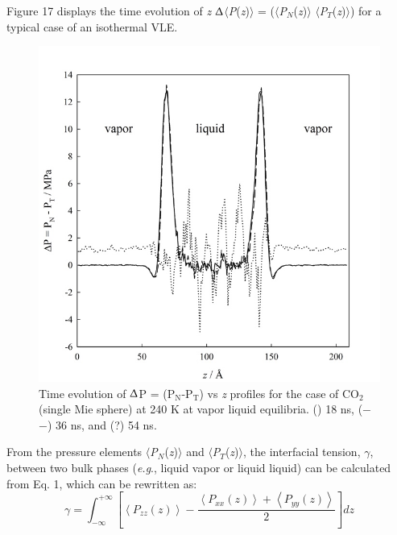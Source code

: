 \documentclass{scrbook}
\begin{document}
Figure 17 displays the time evolution of \textit{z} \textendash{}
${\Updelta}$${\langle}$\textit{P}(\textit{z})${\rangle}$
= (${\langle}$\textit{P}$_{N}$(\textit{z})${\rangle}$ \textendash{}
${\langle}$\textit{P}$_{T}$(\textit{z})${\rangle}$) for a typical case of an
isothermal VLE. 
\begin{figure}
\includegraphics[width=1\textwidth]{gfx/image61.jpeg}
\caption{Time evolution of {${\Updelta}$}P = (P$_{\mathrm{N}}$-P$_{\mathrm{T}}$) vs \textit{z} profiles for the case of CO$_{2}$ (single Mie sphere) at 240 K at vapor \textendash{} liquid equilibria. ({\textbullet}{\textbullet}{\textbullet}) 18 ns, (${-}$ ${-}$) 36 ns, and (?) 54 ns.}
\label{fig:17}
\end{figure}
From the pressure elements ${\langle}$\textit{P}$_{N}$(\textit{z})${\rangle}$
and ${\langle}$\textit{P}$_{T}$(\textit{z})${\rangle}$, the interfacial
tension, ${\gamma}$, between two bulk phases (\textit{e.g}., liquid
\textendash{} vapor or liquid \textendash{} liquid) can be calculated from Eq.
1, which can be rewritten as:
\begin{equation}
\gamma=\int_{{\scriptstyle -\infty}}^{{\scriptstyle +\infty}}\left[\left\langle P_{zz}\left(z\right)\right\rangle -\frac{\left\langle P_{xx}\left(z\right)\right\rangle +\left\langle P_{yy}\left(z\right)\right\rangle }{2}\right]dz
\end{equation}
\end{document}
